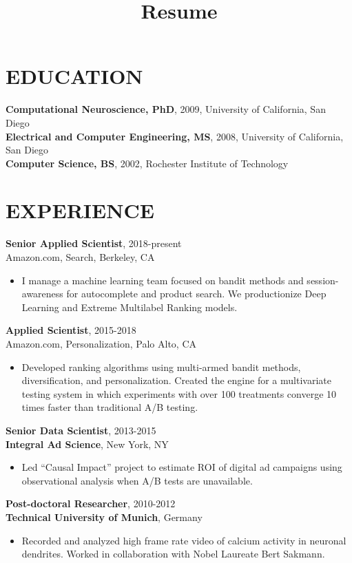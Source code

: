 \documentclass[line,10pt]{res}
\title{Resume}
\begin{document}
 
\thispagestyle{empty} %
\address{716.771.8224}
\address{daniel.n.hill@gmail.com}

\begin{resume}

\section{EDUCATION}
 \textbf{Computational Neuroscience, PhD}, 2009, University of California, San Diego \\
 \textbf{Electrical and Computer Engineering, MS}, 2008, University of California, San Diego \\
 \textbf{Computer Science, BS}, 2002, Rochester Institute of Technology
\section{EXPERIENCE}
 {\bf Senior Applied Scientist}, 2018-present \\ Amazon.com, Search, Berkeley, CA 
  \begin{itemize}
          \item[] I manage a machine learning team focused on bandit methods and session-awareness for autocomplete and product search.  We productionize Deep Learning and Extreme Multilabel Ranking models.
   \end{itemize}

 {\bf Applied Scientist}, 2015-2018 \\ Amazon.com, Personalization, Palo Alto, CA 
  \begin{itemize}
          \item[] Developed ranking algorithms using multi-armed bandit methods, diversification, and personalization. Created the engine for a multivariate testing system in which experiments with over 100 treatments converge 10 times faster than traditional A/B testing.  
   \end{itemize}
   
 {\bf Senior Data Scientist}, 2013-2015 \\ {\bf Integral Ad Science}, New York, NY 
  \begin{itemize}
          \item[] Led ``Causal Impact'' project to estimate ROI of digital ad campaigns using observational analysis when A/B tests are unavailable.
        \end{itemize}
{\bf Post-doctoral Researcher}, 2010-2012 \\ {\bf Technical University of Munich}, Germany 
  \begin{itemize}
        \item[] Recorded and analyzed high frame rate video of calcium activity in neuronal dendrites.  Worked in collaboration with Nobel Laureate Bert Sakmann.       
  \end{itemize}


\end{resume}
\end{document}
